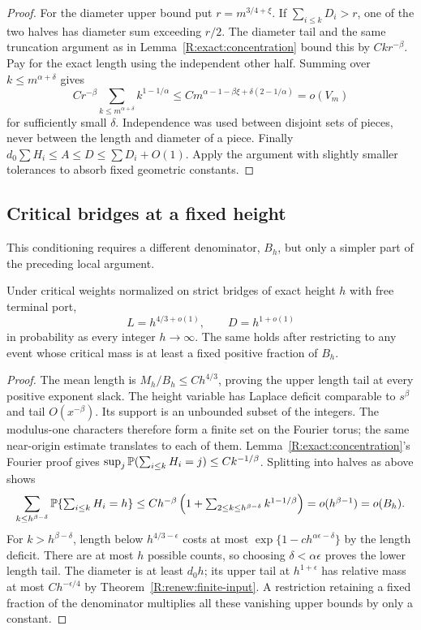 \begin{proof}
For the diameter upper bound put $r=m^{3/4+\xi}$. If $\sum_{i\le k}D_i>r$, one of the two halves has diameter sum exceeding $r/2$. The diameter tail and the same truncation argument as in Lemma~\ref{R:exact:concentration} bound this by $Ckr^{-\beta}$. Pay for the exact length using the independent other half. Summing over $k\le m^{\alpha+\delta}$ gives
\[
 C r^{-\beta}\sum_{k\le m^{\alpha+\delta}}k^{1-1/\alpha}
 \le C m^{\alpha-1-\beta\xi+\delta(2-1/\alpha)}
 =o(V_m)
\]
for sufficiently small $\delta$. Independence was used between disjoint sets of pieces, never between the length and diameter of a piece. Finally $d_0\sum H_i\le A\le D\le\sum D_i+O(1)$. Apply the argument with slightly smaller tolerances to absorb fixed geometric constants.
\end{proof}

\subsection{Critical bridges at a fixed height}
This conditioning requires a different denominator, $B_h$, but only a simpler part of the preceding local argument.
\begin{theorem}\label{R:exact:height}
Under critical weights normalized on strict bridges of exact height $h$ with free terminal port,
\[
 L=h^{4/3+o(1)},\qquad D=h^{1+o(1)}
\]
in probability as every integer $h\to\infty$. The same holds after restricting to any event whose critical mass is at least a fixed positive fraction of $B_h$.
\end{theorem}
\begin{proof}
The mean length is $M_h/B_h\le Ch^{4/3}$, proving the upper length tail at every positive exponent slack. The height variable has Laplace deficit comparable to $s^\beta$ and tail $O(x^{-\beta})$. Its support is an unbounded subset of the integers. The modulus-one characters therefore form a finite set on the Fourier torus; the same near-origin estimate translates to each of them. Lemma~\ref{R:exact:concentration}'s Fourier proof gives
$\sup_j\mathbb P(\sum_{i\le k}H_i=j)\le Ck^{-1/\beta}$.
Splitting into halves as above shows
\[
 \sum_{k\le h^{\beta-\delta}}\mathbb P\{\textstyle\sum_{i\le k}H_i=h\}
 \le Ch^{-\beta}\left(1+\sum_{2\le k\le h^{\beta-\delta}}k^{1-1/\beta}\right)
 =o(h^{\beta-1})=o(B_h).
\]
For $k>h^{\beta-\delta}$, length below $h^{4/3-\epsilon}$ costs at most
$\exp\{1-c h^{\alpha\epsilon-\delta}\}$ by the length deficit. There are at most $h$ possible counts, so choosing $\delta<\alpha\epsilon$ proves the lower length tail. The diameter is at least $d_0h$; its upper tail at $h^{1+\epsilon}$ has relative mass at most $Ch^{-\epsilon/4}$ by Theorem~\ref{R:renew:finite-input}. A restriction retaining a fixed fraction of the denominator multiplies all these vanishing upper bounds by only a constant.
\end{proof}
